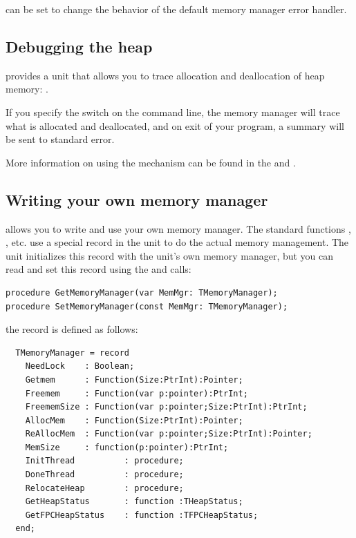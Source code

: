  can be set to change the behavior of 
the default memory manager error handler.

\subsection{Debugging the heap}

\fpc provides a unit that allows you to trace allocation and deallocation
of heap memory: .

If you specify the  switch on the command line, the memory manager
will trace what is allocated and deallocated, and on exit of your program,
a summary will be sent to standard error.

More information on using the  mechanism can be found in the
\userref and \unitsref.

\subsection{Writing your own memory manager}

\fpc allows you to write and use your own memory manager. The standard
functions , ,  etc.
use a special record in the  unit to do the actual memory management.
The  unit initializes this record with the  unit's own memory
manager, but you can read and set this record using the
 and  calls:
\begin{verbatim}
procedure GetMemoryManager(var MemMgr: TMemoryManager);
procedure SetMemoryManager(const MemMgr: TMemoryManager);
\end{verbatim}

the  record is defined as follows:
\begin{verbatim}
  TMemoryManager = record
    NeedLock    : Boolean;
    Getmem      : Function(Size:PtrInt):Pointer;
    Freemem     : Function(var p:pointer):PtrInt;
    FreememSize : Function(var p:pointer;Size:PtrInt):PtrInt;
    AllocMem    : Function(Size:PtrInt):Pointer;
    ReAllocMem  : Function(var p:pointer;Size:PtrInt):Pointer;
    MemSize     : function(p:pointer):PtrInt;
    InitThread          : procedure;
    DoneThread          : procedure;
    RelocateHeap        : procedure;
    GetHeapStatus       : function :THeapStatus;
    GetFPCHeapStatus    : function :TFPCHeapStatus;
  end;
\end{verbatim}

